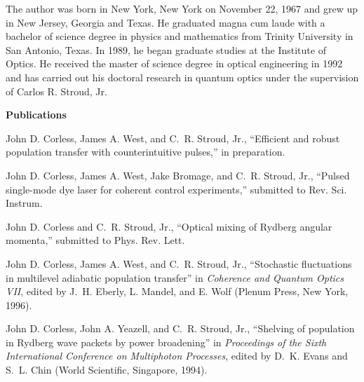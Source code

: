 

The author was born in New York, New York on November 22, 1967 and grew
up in New Jersey, Georgia and Texas.  He graduated magna cum laude with a
bachelor of science degree in physics and mathematics from Trinity University
in San Antonio, Texas.  In 1989, he began graduate studies at the Institute
of Optics.  He received the master of science degree in optical engineering
in 1992 and has carried out his doctoral research in quantum optics under the
supervision of Carlos R. Stroud, Jr.

\begin{singlespace}
\bigskip
\bigskip
\centerline{\large\bf Publications}
\bigskip
\bigskip

\setlength{\parskip}{10pt}

John D. Corless, James A. West, and C.~R. Stroud, Jr., ``Efficient and robust
population transfer with counterintuitive pulses,'' in preparation.

John D. Corless, James A. West, Jake Bromage, and C.~R. Stroud, Jr., ``Pulsed
single-mode dye laser for coherent control experiments,'' submitted to Rev. Sci.
Instrum.

John D. Corless and C.~R. Stroud, Jr., ``Optical mixing of Rydberg angular
momenta,'' submitted to Phys. Rev. Lett.

John D. Corless, James A. West, and C.~R. Stroud, Jr., ``Stochastic
fluctuations in multilevel adiabatic population transfer'' in {\em Coherence and
Quantum Optics VII}, edited by J.~H. Eberly, L. Mandel, and E. Wolf (Plenum
Press, New York, 1996).

John D. Corless, John A. Yeazell, and C.~R. Stroud, Jr., ``Shelving of
population in Rydberg wave packets by power broadening'' in {\em Proceedings of
the Sixth International Conference on Multiphoton Processes}, edited by D.~K.
Evans and S.~L. Chin (World Scientific, Singapore, 1994).

\bigskip
\end{singlespace}

